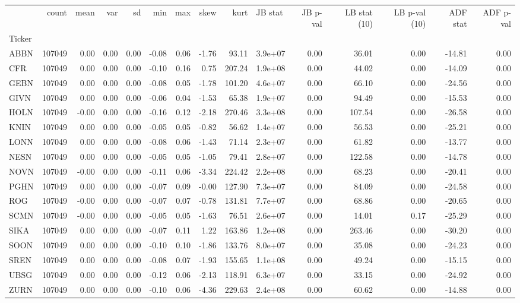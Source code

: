 \begin{tabular}{lrrrrrrrrlrrrrr}
\toprule
 & count & mean & var & sd & min & max & skew & kurt & JB stat & JB p-val & LB stat (10) & LB p-val (10) & ADF stat & ADF p-val \\
Ticker &  &  &  &  &  &  &  &  &  &  &  &  &  &  \\
\midrule
ABBN & 107049 & 0.00 & 0.00 & 0.00 & -0.08 & 0.06 & -1.76 & 93.11 & 3.9e+07 & 0.00 & 36.01 & 0.00 & -14.81 & 0.00 \\
CFR & 107049 & 0.00 & 0.00 & 0.00 & -0.10 & 0.16 & 0.75 & 207.24 & 1.9e+08 & 0.00 & 44.02 & 0.00 & -14.09 & 0.00 \\
GEBN & 107049 & 0.00 & 0.00 & 0.00 & -0.08 & 0.05 & -1.78 & 101.20 & 4.6e+07 & 0.00 & 66.10 & 0.00 & -24.56 & 0.00 \\
GIVN & 107049 & 0.00 & 0.00 & 0.00 & -0.06 & 0.04 & -1.53 & 65.38 & 1.9e+07 & 0.00 & 94.49 & 0.00 & -15.53 & 0.00 \\
HOLN & 107049 & -0.00 & 0.00 & 0.00 & -0.16 & 0.12 & -2.18 & 270.46 & 3.3e+08 & 0.00 & 107.54 & 0.00 & -26.58 & 0.00 \\
KNIN & 107049 & 0.00 & 0.00 & 0.00 & -0.05 & 0.05 & -0.82 & 56.62 & 1.4e+07 & 0.00 & 56.53 & 0.00 & -25.21 & 0.00 \\
LONN & 107049 & 0.00 & 0.00 & 0.00 & -0.08 & 0.06 & -1.43 & 71.14 & 2.3e+07 & 0.00 & 61.82 & 0.00 & -13.77 & 0.00 \\
NESN & 107049 & 0.00 & 0.00 & 0.00 & -0.05 & 0.05 & -1.05 & 79.41 & 2.8e+07 & 0.00 & 122.58 & 0.00 & -14.78 & 0.00 \\
NOVN & 107049 & -0.00 & 0.00 & 0.00 & -0.11 & 0.06 & -3.34 & 224.42 & 2.2e+08 & 0.00 & 68.23 & 0.00 & -20.41 & 0.00 \\
PGHN & 107049 & 0.00 & 0.00 & 0.00 & -0.07 & 0.09 & -0.00 & 127.90 & 7.3e+07 & 0.00 & 84.09 & 0.00 & -24.58 & 0.00 \\
ROG & 107049 & -0.00 & 0.00 & 0.00 & -0.07 & 0.07 & -0.78 & 131.81 & 7.7e+07 & 0.00 & 68.86 & 0.00 & -20.65 & 0.00 \\
SCMN & 107049 & -0.00 & 0.00 & 0.00 & -0.05 & 0.05 & -1.63 & 76.51 & 2.6e+07 & 0.00 & 14.01 & 0.17 & -25.29 & 0.00 \\
SIKA & 107049 & 0.00 & 0.00 & 0.00 & -0.07 & 0.11 & 1.22 & 163.86 & 1.2e+08 & 0.00 & 263.46 & 0.00 & -30.20 & 0.00 \\
SOON & 107049 & 0.00 & 0.00 & 0.00 & -0.10 & 0.10 & -1.86 & 133.76 & 8.0e+07 & 0.00 & 35.08 & 0.00 & -24.23 & 0.00 \\
SREN & 107049 & 0.00 & 0.00 & 0.00 & -0.08 & 0.07 & -1.93 & 155.65 & 1.1e+08 & 0.00 & 49.24 & 0.00 & -15.15 & 0.00 \\
UBSG & 107049 & 0.00 & 0.00 & 0.00 & -0.12 & 0.06 & -2.13 & 118.91 & 6.3e+07 & 0.00 & 33.15 & 0.00 & -24.92 & 0.00 \\
ZURN & 107049 & 0.00 & 0.00 & 0.00 & -0.10 & 0.06 & -4.36 & 229.63 & 2.4e+08 & 0.00 & 60.62 & 0.00 & -14.88 & 0.00 \\
\bottomrule
\end{tabular}
